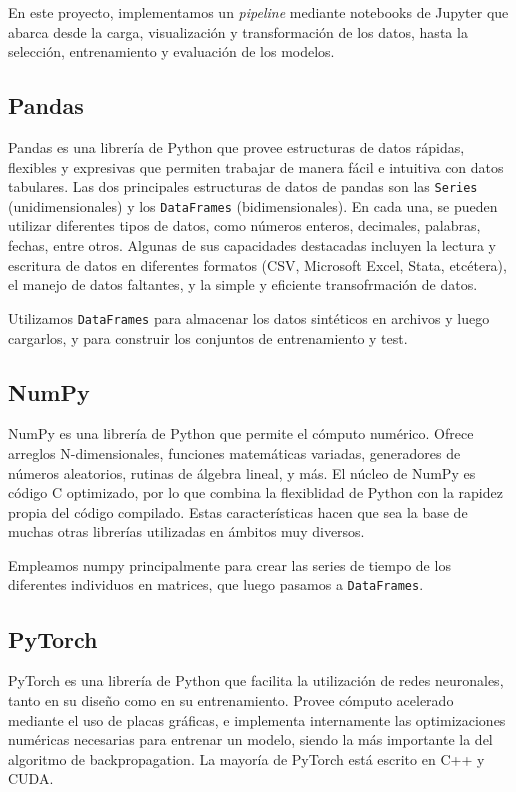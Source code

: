 \documentclass[../../main.tex]{subfiles}
\begin{document}
En este proyecto, implementamos un \textit{pipeline} mediante notebooks de Jupyter que
abarca desde la carga, visualización y transformación de los datos, hasta la selección,
entrenamiento y evaluación de los modelos.



\subsection{Pandas}
Pandas \cite{pandas-docs} es una librería de Python que provee estructuras de datos
rápidas, flexibles y expresivas que permiten trabajar de manera fácil e intuitiva con
datos tabulares. Las dos principales estructuras de datos de pandas son las
\texttt{Series} (unidimensionales) y los \texttt{DataFrames} (bidimensionales). En cada
una, se pueden utilizar diferentes tipos de datos, como números enteros, decimales,
palabras, fechas, entre otros. Algunas de sus capacidades destacadas incluyen la lectura y
escritura de datos en diferentes formatos (CSV, Microsoft Excel, Stata, etcétera), el
manejo de datos faltantes, y la simple y eficiente transofrmación de datos.

Utilizamos \texttt{DataFrames} para almacenar los datos sintéticos en archivos y luego
cargarlos, y para construir los conjuntos de entrenamiento y test.

\subsection{NumPy}
NumPy \cite{numpy-docs} es una librería de Python que permite el cómputo numérico. Ofrece
arreglos N-dimensionales, funciones matemáticas variadas, generadores de números
aleatorios, rutinas de álgebra lineal, y más. El núcleo de NumPy es código C optimizado,
por lo que combina la flexiblidad de Python con la rapidez propia del código compilado.
Estas características hacen que sea la base de muchas otras librerías utilizadas en
ámbitos muy diversos.

Empleamos numpy principalmente para crear las series de tiempo de los diferentes
individuos en matrices, que luego pasamos a \texttt{DataFrames}.

\subsection{PyTorch}
PyTorch \cite{pytorch-docs} es una librería de Python que facilita la utilización de redes
neuronales, tanto en su diseño como en su entrenamiento. Provee cómputo acelerado mediante
el uso de placas gráficas, e implementa internamente las optimizaciones numéricas
necesarias para entrenar un modelo, siendo la más importante la del algoritmo de
backpropagation. La mayoría de PyTorch está escrito en C++ y CUDA.
\end{document}
